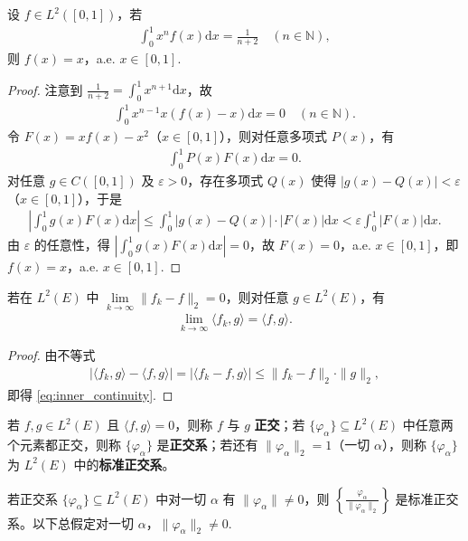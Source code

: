 \documentclass[../../main.tex]{subfiles}%
\begin{document}
\begin{example}
设 $f \in L^2([0,1])$，若
\begin{align*}
\int_0^1 x^n f(x) \mathrm{d}x = \frac{1}{n+2} \quad (n \in \mathbb{N}),
\end{align*}
则 $f(x) = x$，a.e. $x \in [0,1]$.
\end{example}
\begin{proof}
注意到 $\frac{1}{n+2} = \int_0^1 x^{n+1} \mathrm{d}x$，故
\begin{align*}
\int_0^1 x^{n-1} x(f(x) - x) \mathrm{d}x = 0 \quad (n \in \mathbb{N}).
\end{align*}
令 $F(x) = xf(x) - x^2$（$x \in [0,1]$），则对任意多项式 $P(x)$，有
\begin{align*}
\int_0^1 P(x) F(x) \mathrm{d}x = 0.
\end{align*}
对任意 $g \in C([0,1])$ 及 $\varepsilon > 0$，存在多项式 $Q(x)$ 使得 $|g(x) - Q(x)| < \varepsilon$（$x \in [0,1]$），于是
\begin{align*}
\left| \int_0^1 g(x) F(x) \mathrm{d}x \right| \leqslant \int_0^1 |g(x) - Q(x)| \cdot |F(x)| \mathrm{d}x < \varepsilon \int_0^1 |F(x)| \mathrm{d}x.
\end{align*}
由 $\varepsilon$ 的任意性，得 $\left| \int_0^1 g(x) F(x) \mathrm{d}x \right| = 0$，故 $F(x) = 0$，a.e. $x \in [0,1]$，即 $f(x) = x$，a.e. $x \in [0,1]$.
\end{proof}

\begin{theorem}[内积的连续性]
若在 $L^2(E)$ 中 $\lim\limits_{k \to \infty} \|f_k - f\|_2 = 0$，则对任意 $g \in L^2(E)$，有
\begin{align}
\lim\limits_{k \to \infty} \langle f_k, g \rangle = \langle f, g \rangle. \label{eq:inner_continuity}
\end{align}
\end{theorem}
\begin{proof}
由不等式
\begin{align*}
|\langle f_k, g \rangle - \langle f, g \rangle| = |\langle f_k - f, g \rangle| \leqslant \|f_k - f\|_2 \cdot \|g\|_2,
\end{align*}
即得 \eqref{eq:inner_continuity}.
\end{proof}

\begin{definition}
若 $f, g \in L^2(E)$ 且 $\langle f, g \rangle = 0$，则称 $f$ 与 $g$ \textbf{正交}；若 $\{\varphi_\alpha\} \subseteq L^2(E)$ 中任意两个元素都正交，则称 $\{\varphi_\alpha\}$ 是\textbf{正交系}；若还有 $\|\varphi_\alpha\|_2 = 1$（一切 $\alpha$），则称 $\{\varphi_\alpha\}$ 为 $L^2(E)$ 中的\textbf{标准正交系}。
\end{definition}
\begin{remark}
若正交系 $\{\varphi_\alpha\} \subseteq L^2(E)$ 中对一切 $\alpha$ 有 $\|\varphi_\alpha\| \neq 0$，则 $\left\{ \frac{\varphi_\alpha}{\|\varphi_\alpha\|_2} \right\}$ 是标准正交系。以下总假定对一切 $\alpha$，$\|\varphi_\alpha\|_2 \neq 0$.
\end{remark}
\end{document}
